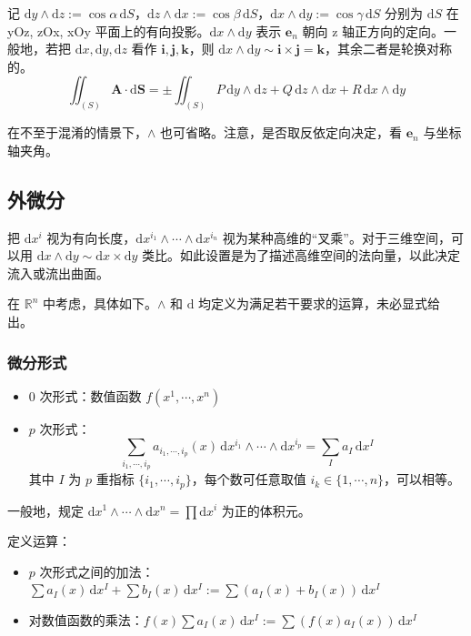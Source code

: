 \documentclass[12pt, a4paper, UTF8, openany]{ctexbook}
\newcommand{\dif}{\mathrm{d}}
\newcommand{\sdif}{\,\dif}
\newcommand{\field}[1]{\mathbb{#1}}%
\newcommand{\mat}[1]{\mathbf{#1}}
\begin{document}
        记 $\dif y \land \dif z := \cos\alpha \sdif S$，$\dif z \land \dif x := \cos\beta \sdif S$，$\dif x \land \dif y := \cos\gamma \sdif S$ 分别为 $\dif S$ 在 yOz, zOx, xOy 平面上的{\heiti 有向}投影。$\dif x \land \dif y$ 表示 $\mat{e}_n$ 朝向 z 轴正方向的定向。一般地，若把 $\dif x, \dif y, \dif z$ 看作 $\mat{i, j, k}$，则 $\dif x \land \dif y \sim \mat{i} \times \mat{j} = \mat{k}$，其余二者是轮换对称的。
        $$\iint_{(S)} \mat{A} \cdot \mat{\dif S} = \pm\iint_{(S)} P\sdif y \land \dif z + Q\sdif z \land \dif x + R\sdif x \land \dif y$$

        在不至于混淆的情景下，$\land$ 也可省略。{\heiti 注意}，是否取反依定向决定，看 $\mat{e}_n$ 与坐标轴夹角。

        \subsection{外微分}
        把 $\dif x^i$ 视为有向长度，$\dif x^{i_1} \land \cdots \land \dif x^{i_n}$ 视为某种高维的“叉乘”。对于三维空间，可以用 $\dif x \land \dif y \sim \dif x \times \dif y$ 类比。如此设置是为了描述高维空间的法向量，以此决定流入或流出曲面。

        在 $\field{R}^n$ 中考虑，具体如下。$\land$ 和 $\dif$ 均定义为满足若干要求的运算，未必显式给出。

        \subsubsection{微分形式}
        \begin{itemize}
            \item $0$ 次形式：数值函数 $f(x^1, \cdots, x^n)$
            \item $p$ 次形式：
                $$\sum_{i_1, \cdots, i_p} a_{i_1, \cdots, i_p}(x) \sdif x^{i_1} \land \cdots \land \dif x^{i_p} = \sum_{I} a_{I} \sdif x^{I}$$
                其中 $I$ 为 $p$ 重指标 $\{i_1, \cdots, i_p\}$，每个数可任意取值 $i_k \in \{1, \cdots, n\}$，可以相等。
        \end{itemize}

        一般地，规定 $\dif x^1 \land \cdots \land \dif x^n = \prod \dif x^i$ 为正的体积元。

        定义运算：
        \begin{itemize}
            \item $p$ 次形式之间的加法：$\sum a_{I}(x) \sdif x^I + \sum b_{I}(x) \sdif x^I := \sum (a_{I}(x) + b_{I}(x)) \sdif x^I$
            \item 对数值函数的乘法：$f(x) \sum a_{I}(x) \sdif x^I := \sum (f(x) a_I(x)) \sdif x^I$
        \end{itemize}
\end{document}
